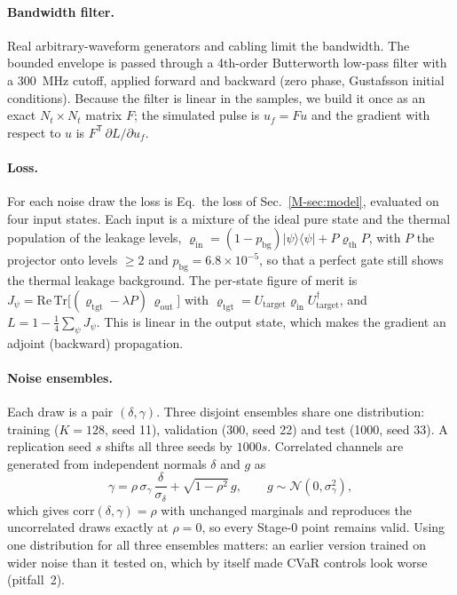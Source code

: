 \documentclass[aps,pra,onecolumn,notitlepage,superscriptaddress,nofootinbib,floatfix]{revtex4-2}
\begin{document}
\paragraph*{Bandwidth filter.} Real arbitrary-waveform generators and cabling
limit the bandwidth. The bounded envelope is passed through a 4th-order
Butterworth low-pass filter with a 300~MHz cutoff, applied forward and
backward (zero phase, Gustafsson initial conditions). Because the filter is
linear in the samples, we build it once as an exact $N_t\times N_t$ matrix $F$;
the simulated pulse is $u_f=Fu$ and the gradient with respect to $u$ is
$F^{\mathsf T}\,\partial L/\partial u_f$.

\paragraph*{Loss.} For each noise draw the loss is Eq.~the loss of Sec.~\ref{M-sec:model},
evaluated on four input states. Each input is a mixture of the ideal pure state
and the thermal population of the leakage levels,
$\varrho_{\mathrm{in}}=(1-p_{\mathrm{bg}})|\psi\rangle\langle\psi|+P\varrho_{\mathrm{th}}P$,
with $P$ the projector onto levels $\ge2$ and $p_{\mathrm{bg}}=6.8\times10^{-5}$,
so that a perfect gate still shows the thermal leakage background. The
per-state figure of merit is
$J_\psi=\mathrm{Re}\,\mathrm{Tr}\big[(\varrho_{\mathrm{tgt}}-\lambda P)\,\varrho_{\mathrm{out}}\big]$
with $\varrho_{\mathrm{tgt}}=U_{\mathrm{target}}\varrho_{\mathrm{in}}U_{\mathrm{target}}^\dagger$,
and $L=1-\tfrac14\sum_\psi J_\psi$. This is linear in the output state, which
makes the gradient an adjoint (backward) propagation.

\paragraph*{Noise ensembles.} Each draw is a pair $(\delta,\gamma)$. Three
disjoint ensembles share one distribution: training ($K=128$, seed 11),
validation (300, seed 22) and test (1000, seed 33). A replication seed $s$
shifts all three seeds by $1000s$. Correlated channels are generated from
independent normals $\delta$ and $g$ as
\begin{equation}
\gamma=\rho\,\sigma_\gamma\,\frac{\delta}{\sigma_\delta}+\sqrt{1-\rho^2}\,g ,
\qquad g\sim\mathcal N(0,\sigma_\gamma^2),
\label{eq:corr}
\end{equation}
which gives $\mathrm{corr}(\delta,\gamma)=\rho$ with unchanged marginals and
reproduces the uncorrelated draws exactly at $\rho=0$, so every Stage-0 point
remains valid. Using one distribution for all three ensembles matters: an
earlier version trained on wider noise than it tested on, which by itself
made CVaR controls look worse (pitfall~2).
\end{document}
